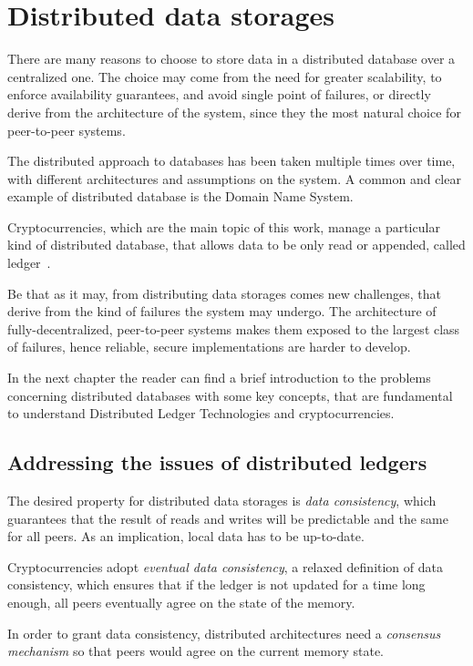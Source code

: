 \chapter{Distributed data storages}
\label{intro}
There are many reasons to choose to store data in a distributed database over a centralized one. The choice may come from the need for greater scalability, to enforce availability guarantees, and avoid single point of failures, or directly derive from the architecture of the system, since they the most natural choice for peer-to-peer systems.

The distributed approach to databases has been taken multiple times over time, with different architectures and assumptions on the system. A common and clear example of distributed database is the Domain Name System.

Cryptocurrencies, which are the main topic of this work, manage a particular kind of distributed database, that allows data to be only read or appended, called ledger~\cite{Sunyaev2020}. 

Be that as it may, from distributing data storages comes new challenges, that derive from the kind of failures the system may undergo. The architecture of fully-decentralized, peer-to-peer systems makes them exposed to the largest class of failures, hence reliable, secure implementations are harder to develop.

In the next chapter the reader can find a brief introduction to the problems concerning distributed databases with some key concepts, that are fundamental to understand Distributed Ledger Technologies and cryptocurrencies. 

\section{Addressing the issues of distributed ledgers}\label{ledgerproblems}
The desired property  for distributed data storages is \emph{data consistency}, which guarantees that the result of reads and writes will be predictable and the same for all peers. As an implication, local data has to be up-to-date. 

Cryptocurrencies adopt \emph{eventual data consistency}, a relaxed definition of data consistency, which ensures that if the ledger is not updated for a time long enough, all peers eventually agree on the state of the memory.

In order to grant data consistency, distributed architectures need a \emph{consensus mechanism} so that peers would agree on the current memory state.


